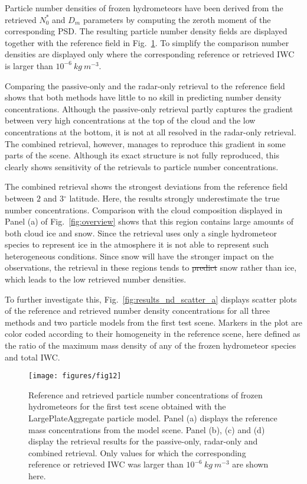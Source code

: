 \documentclass[journal abbreviation, manuscript]{copernicus}
\providecommand{\DIFadd}[1]{{\protect\color{blue}\uwave{#1}}} %
\providecommand{\DIFdel}[1]{{\protect\color{red}\sout{#1}}}                      %
\providecommand{\DIFaddbegin}{} %
\providecommand{\DIFaddend}{} %
\providecommand{\DIFdelbegin}{} %
\providecommand{\DIFdelend}{} %
\begin{document}
Particle number densities of frozen hydrometeors have been derived from the
retrieved $N_0^*$ and $D_m$ parameters by computing the zeroth moment of the
corresponding PSD. The resulting particle number density fields are displayed
together with the reference field in Fig.~\ref{fig:results_nd_a}. To simplify
the comparison number densities are displayed only where the corresponding
reference or retrieved IWC is larger than $10^{-6}\ \unit{kg\ m^{-3}}$.

Comparing the passive-only and the radar-only retrieval to the reference field
shows that both methods have little to no skill in predicting number density
concentrations. Although the passive-only retrieval partly captures the
gradient between very high concentrations at the top of the cloud and the low
concentrations at the bottom, it is not at all resolved in the radar-only
retrieval. The combined retrieval, however, manages to reproduce this gradient
in some parts of the scene. Although its exact structure is not fully
reproduced, this clearly shows sensitivity of the retrievals to particle number
concentrations.

The combined retrieval shows the strongest deviations from the reference field
between $2$ and $3\unit{^\circ}$ latitude. Here, the results strongly
underestimate the true number concentrations. Comparison with the cloud
composition displayed in Panel (a) of Fig.~\ref{fig:overview} shows that this
region contains large amounts of both cloud ice and snow. Since the retrieval
uses only a single hydrometeor species to represent ice in the atmosphere it is
not able to represent such heterogeneous conditions. Since snow will have the
stronger impact on the observations, the retrieval in these regions tends to
\DIFdelbegin \DIFdel{predict }\DIFdelend \DIFaddbegin \DIFadd{represent }\DIFaddend snow rather than ice, which leads to the low retrieved number densities.

To further investigate this, Fig.~\ref{fig:results_nd_scatter_a} displays
scatter plots of the reference and retrieved number density concentrations for
all three methods and two particle models from the first test scene. Markers in
the plot are color coded according to their homogeneity in the reference scene,
here defined as the ratio of the maximum mass density of any of the frozen
hydrometeor species and total IWC. 

\begin{figure}
\centering
\texttt{[image: figures/fig12]}
\caption{Reference and retrieved particle number concentrations of frozen
  hydrometeors for the first test scene obtained with the LargePlateAggregate
  particle model. Panel (a) displays the reference mass concentrations from the
  model scene. Panel (b), (c) and (d) display the retrieval results for the
  passive-only, radar-only and combined retrieval. Only values for which the corresponding
  reference or retrieved IWC was larger than  $10^{-6}\ \unit{kg\ m^{-3}}$ are shown here.}
\label{fig:results_nd_a}
\end{figure}
\end{document}
